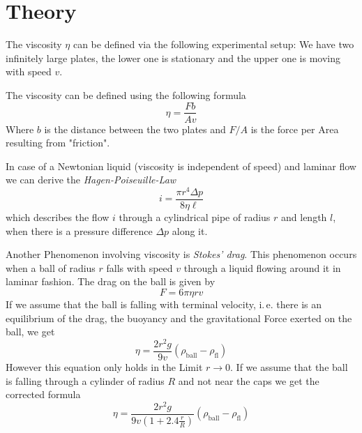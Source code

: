 \section{Theory}

The viscosity $\eta$ can be defined via the following experimental setup: We have two infinitely large plates, the lower one is stationary and the upper one is moving with speed $v$.

The viscosity can be defined using the following formula
\[
    \eta = \frac{F b}{A v} \label{eq:vis}
\]
Where $b$ is the distance between the two plates and $F/A$ is the force per Area resulting from "friction".

In case of a Newtonian liquid (viscosity is independent of speed) and laminar flow  we can derive the \emph{Hagen-Poiseuille-Law} 
\[
    i = \frac{\pi r^4 \Delta p}{8 \eta \ell} \label{eq:hp}
\]
which describes the flow $i$ through a cylindrical pipe of radius $r$ and length $l$, when there is a pressure difference $\Delta p$ along it.

Another Phenomenon involving viscosity is \emph{Stokes' drag}. This phenomenon occurs when a ball of radius $r$ falls with speed $v$ through a liquid flowing around it in laminar fashion. The drag on the ball is given by
\[
    F = 6 \pi \eta r v \label{eq:stokes}
\]
If we assume that the ball is falling with terminal velocity, i.\,e. there is an equilibrium of the drag, the buoyancy and the gravitational Force exerted on the ball, we get
\[
    \eta = \frac{2 r^2 g}{9 v}(\rho_\mathrm{ball} - \rho_\mathrm{fl}) \label{eq:termid}
\]
However this equation only holds in the Limit $r \to 0$. 
If we assume that the ball is falling through a cylinder of radius $R$ and not near the caps we get the corrected formula
\[
    \eta = \frac{2 r^2 g}{9 v \left( 1 + 2.4 \frac{r}{R} \right)}(\rho_\mathrm{ball} - \rho_\mathrm{fl}) \label{eq:term}
\]




